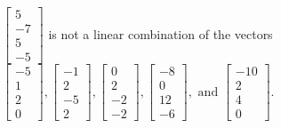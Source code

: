 \begin{exercise}
\begin{exerciseStatement}
  \end{exerciseStatement}
  \begin{exerciseAnswer}
   \(\left[\begin{array}{c}
5 \\
-7 \\
5 \\
-5
\end{array}\right]\) 
  	 is not  
	a linear combination of the vectors \(\left[\begin{array}{c}
-5 \\
1 \\
2 \\
0
\end{array}\right] , \left[\begin{array}{c}
-1 \\
2 \\
-5 \\
2
\end{array}\right] , \left[\begin{array}{c}
0 \\
2 \\
-2 \\
-2
\end{array}\right] , \left[\begin{array}{c}
-8 \\
0 \\
12 \\
-6
\end{array}\right] , \text{ and } \left[\begin{array}{c}
-10 \\
2 \\
4 \\
0
\end{array}\right]\).

	
  


  \end{exerciseAnswer}
\end{exercise}